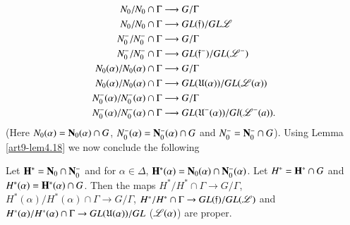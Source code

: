 \begin{align*}
N_0 / N_0 \cap \Gamma & \longrightarrow G / \Gamma\\
N_0 / N_0 \cap \Gamma & \longrightarrow GL (\mathfrak{f}) / GL \mathscr{L}\\
N^-_0 / N^-_0 \cap \Gamma & \longrightarrow G/ \Gamma\\
N^-_0 / N^-_0 \cap \Gamma & \longrightarrow G L (\mathfrak{f}^-) /GL (\mathscr{L}^-)\\
N_0 (\alpha)/ N_0 (\alpha) \cap \Gamma & \longrightarrow G/ \Gamma\\
N_0 (\alpha) / N_0 (\alpha) \cap \Gamma & \longrightarrow GL (\mathfrak{U}(\alpha)) / GL (\mathscr{L}(\alpha))\\
N^-_0 (\alpha) / N^-_0 (\alpha) \cap \Gamma & \longrightarrow G/ \Gamma\\
N^-_0 (\alpha) / N^-_0 (\alpha) \cap \Gamma & \longrightarrow GL (\mathfrak{U}^-(\alpha)) / Gl (\mathscr{L}^- (a)).
\end{align*}\pageoriginale
(Here $N_0 (\alpha) = \mathbf{N}_0 (\alpha) \cap G$, $N^-_0 (\alpha) = \mathbf{N}^-_0 (\alpha) \cap G$ and $N^-_0 = \mathbf{N}^-_0 \cap G$). Using Lemma \ref{art9-lem4.18} we now conclude the following

\begin{lemma}\label{art9-lem4.29}
Let $\mathbf{H}^\ast = \mathbf{N}_0 \cap \mathbf{N}^-_0$ and for $\alpha \in \Delta$, $\mathbf{H}^\ast (\alpha) = \mathbf{N}_0 (\alpha) \cap \mathbf{N}^-_0 (\alpha)$. Let $H^\ast = \mathbf{H}^\ast \cap G$ and $H^\ast (\alpha) = \mathbf{H}^\ast (\alpha) \cap G$. Then the maps $H^\ast / H^\ast \cap \Gamma \to G/\Gamma$, $H^\ast (\alpha)/H^\ast (\alpha) \cap \Gamma \to G/ \Gamma$, $H^\ast/H^\ast \cap \Gamma \to G L(\mathfrak{f})/GL (\mathscr{L})$ and $H^\ast (\alpha)/H^\ast (\alpha) \cap \Gamma \to GL (\mathfrak{U} (\alpha)) / GL $  ($\mathscr{L}(\alpha)$) are proper.
\end{lemma}

